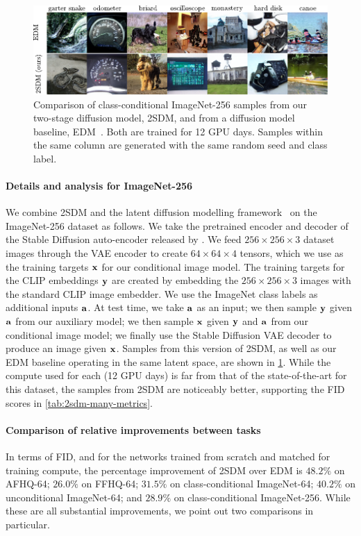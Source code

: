 \begin{figure}[t]
    \includegraphics[width=\textwidth]{figs/2sdm/2SDM-main-fig.pdf}
    \caption{Comparison of class-conditional ImageNet-256 samples from our two-stage diffusion model, 2SDM, and from a diffusion model baseline, EDM~\citep{karras2022elucidating}. Both are trained for 12 GPU days. Samples within the same column are generated with the same random seed and class label.}
    \label{fig:latent-imagenet-samples}
\end{figure}

\paragraph{Details and analysis for ImageNet-256}
We combine 2SDM and the latent diffusion modelling framework~\citep{rombach2022high} on the ImageNet-256 dataset as follows. We take the pretrained encoder and decoder of the Stable Diffusion auto-encoder released by \citet{rombach2022high}. We feed $256\times256\times3$ dataset images through the VAE encoder to create $64\times64\times4$ tensors, which we use as the training targets ${\mathbf{x}}$ for our conditional image model. The training targets for the CLIP embeddings ${\mathbf{y}}$ are created by embedding the $256\times256\times3$ images with the standard CLIP image embedder. We use the ImageNet class labels as additional inputs ${\mathbf{a}}$. At test time, we take ${\mathbf{a}}$ as an input; we then sample ${\mathbf{y}}$ given ${\mathbf{a}}$ from our auxiliary model; we then sample ${\mathbf{x}}$ given ${\mathbf{y}}$ and ${\mathbf{a}}$ from our conditional image model; we finally use the Stable Diffusion VAE decoder to produce an image given ${\mathbf{x}}$. Samples from this version of 2SDM, as well as our EDM baseline operating in the same latent space, are shown in \cref{fig:latent-imagenet-samples}. While the compute used for each (12 GPU days) is far from that of the state-of-the-art for this dataset, the samples from 2SDM are noticeably better, supporting the FID scores in \cref{tab:2sdm-many-metrics}.

\paragraph{Comparison of relative improvements between tasks}
In terms of FID, and for the networks trained from scratch and matched for training compute, the percentage improvement of 2SDM over EDM is $48.2\%$ on AFHQ-64; $26.0\%$ on FFHQ-64; $31.5\%$ on class-conditional ImageNet-64; $40.2\%$ on unconditional ImageNet-64; and $28.9\%$ on class-conditional ImageNet-256. While these are all substantial improvements, we point out two comparisons in particular. 

